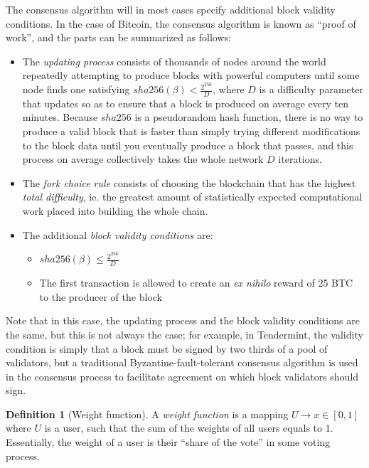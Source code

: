 \documentclass[11pt,a4paper]{article}
\theoremstyle{plain}
\theoremstyle{definition}
\newtheorem{defn}{Definition}[section]
\theoremstyle{remark}
\begin{document}
The consensus algorithm will in most cases specify additional block validity conditions. In the case of Bitcoin, the consensus algorithm is known as ``proof of work'', and the parts can be summarized as follows:

\begin{itemize}
\item
The \emph{updating process} consists of thousands of nodes around the world repeatedly attempting to produce blocks with powerful computers until some node finds one satisfying $sha256(\beta) < \frac{2^{256}}{D}$, where $D$ is a difficulty parameter that updates so as to ensure that a block is produced on average every ten minutes. Because $sha256$ is a pseudorandom hash function, there is no way to produce a valid block that is faster than simply trying different modifications to the block data until you eventually produce a block that passes, and this process on average collectively takes the whole network $D$ iterations.
\item
The \emph{fork choice rule} consists of choosing the blockchain that has the highest \emph{total difficulty}, ie. the greatest amount of statistically expected computational work placed into building the whole chain.
\item
The additional \emph{block validity conditions} are:
    \begin{itemize}
    \item
    $sha256(\beta) \le \frac{2^{256}}{D}$
    \item
    The first transaction is allowed to create an \emph{ex nihilo} reward of 25 BTC to the producer of the block
    \end{itemize}
\end{itemize}

Note that in this case, the updating process and the block validity conditions are the same, but this is not always the case; for example, in Tendermint\cite{tendermint}, the validity condition is simply that a block must be signed by two thirds of a pool of validators, but a traditional Byzantine-fault-tolerant consensus algorithm is used in the consensus process to facilitate agreement on which block validators should sign.

\begin{defn}[Weight function]
A \emph{weight function} is a mapping $U \rightarrow x \in [0,1]$ where $U$ is a user, such that the sum of the weights of all users equals to 1. Essentially, the weight of a user is their ``share of the vote'' in some voting process.
\end{defn}
\end{document}
